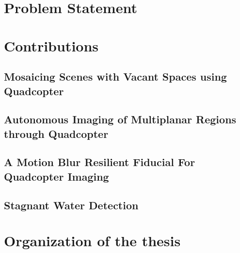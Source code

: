 \section{Problem Statement}
  
\section{Contributions}
\subsection{Mosaicing Scenes with Vacant Spaces using Quadcopter}
\subsection{Autonomous Imaging of Multiplanar Regions through Quadcopter}
\subsection{A Motion Blur Resilient Fiducial For Quadcopter Imaging}
\subsection{Stagnant Water Detection}
\section{Organization of the thesis}
